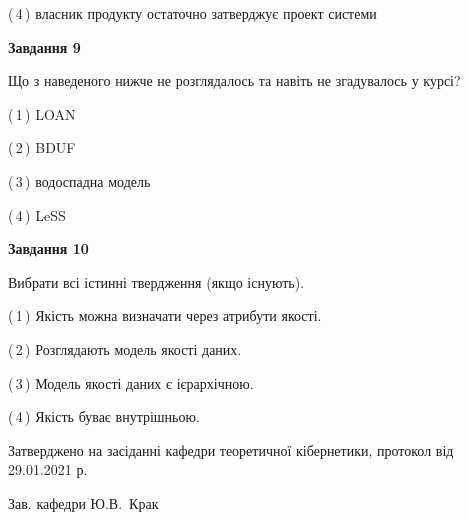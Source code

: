 \documentclass[10pt, ukrainian]{article}
\begin{document}
{\begin {large}
(\,4\,) власник продукту остаточно затверджує проект системи%


{\begin {center}\textbf{Завдання 9}\end {center}}\par
Що з наведеного нижче не розглядалось та навіть не згадувалось у курсі?\par
\vspace{2mm}



(\,1\,) LOAN%



(\,2\,) BDUF%



(\,3\,) водоспадна модель%



(\,4\,) LeSS%


{\begin {center}\textbf{Завдання 10}\end {center}}\par
Вибрати всі істинні твердження (якщо існують).\par
\vspace{2mm}



(\,1\,) Якість можна визначати через атрибути якості.%



(\,2\,) Розглядають модель якості даних.%



(\,3\,) Модель якості даних є ієрархічною.%



(\,4\,) Якість буває внутрішньою.%



\end {large}}
{\vspace{5mm}\smallskip \begin {small} Затверджено на засіданні кафедри теоретичної кібернетики, протокол  від   29.01.2021 р.\par\smallskip\smallskip
{\parbox {6.5 cm}{Зав. кафедри \dotfill Ю.В.~Крак}} \end{small}}
\newpage
\end{document}
